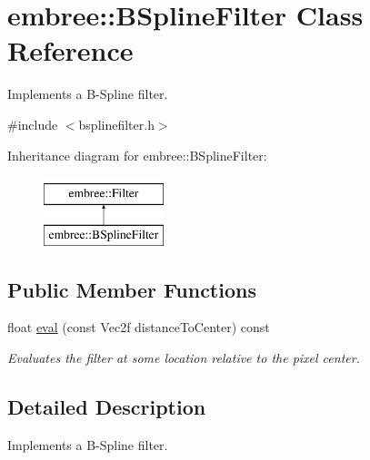 \hypertarget{classembree_1_1_b_spline_filter}{
\section{embree::BSplineFilter Class Reference}
\label{classembree_1_1_b_spline_filter}
}


Implements a B-\/Spline filter.  




{\ttfamily \#include $<$bsplinefilter.h$>$}

Inheritance diagram for embree::BSplineFilter:\begin{figure}[H]
\begin{center}
\leavevmode
\includegraphics[height=2.000000cm]{classembree_1_1_b_spline_filter}
\end{center}
\end{figure}
\subsection*{Public Member Functions}
\begin{DoxyCompactItemize}
\item 
float \hyperlink{classembree_1_1_b_spline_filter_a43711f575149d124abc9750088c3ffec}{eval} (const Vec2f distanceToCenter) const 
\begin{DoxyCompactList}\small\item\em Evaluates the filter at some location relative to the pixel center. \item\end{DoxyCompactList}\end{DoxyCompactItemize}


\subsection{Detailed Description}
Implements a B-\/Spline filter. 

